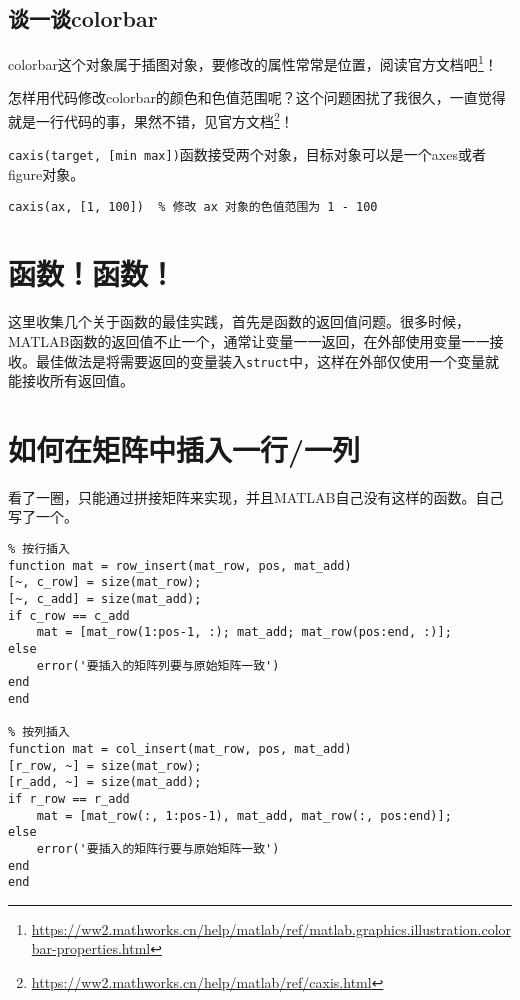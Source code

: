 \subsection{谈一谈colorbar}

colorbar这个对象属于插图对象，要修改的属性常常是位置，阅读官方文档吧\footnote{\url{https://ww2.mathworks.cn/help/matlab/ref/matlab.graphics.illustration.colorbar-properties.html}}！

怎样用代码修改colorbar的颜色和色值范围呢？这个问题困扰了我很久，一直觉得就是一行代码的事，果然不错，见官方文档\footnote{\url{https://ww2.mathworks.cn/help/matlab/ref/caxis.html}}！

\texttt{caxis(target, [min max])}函数接受两个对象，目标对象可以是一个axes或者figure对象。

\begin{verbatim}
caxis(ax, [1, 100])  % 修改 ax 对象的色值范围为 1 - 100
\end{verbatim}

\section{函数！函数！}

这里收集几个关于函数的最佳实践，首先是函数的返回值问题。很多时候，MATLAB函数的返回值不止一个，通常让变量一一返回，在外部使用变量一一接收。最佳做法是将需要返回的变量装入\texttt{struct}中，这样在外部仅使用一个变量就能接收所有返回值。

\section{如何在矩阵中插入一行/一列}

看了一圈，只能通过拼接矩阵来实现，并且MATLAB自己没有这样的函数。自己写了一个。

\begin{verbatim}
% 按行插入
function mat = row_insert(mat_row, pos, mat_add)
[~, c_row] = size(mat_row);
[~, c_add] = size(mat_add);
if c_row == c_add
    mat = [mat_row(1:pos-1, :); mat_add; mat_row(pos:end, :)];
else
    error('要插入的矩阵列要与原始矩阵一致')
end
end

% 按列插入
function mat = col_insert(mat_row, pos, mat_add)
[r_row, ~] = size(mat_row);
[r_add, ~] = size(mat_add);
if r_row == r_add
    mat = [mat_row(:, 1:pos-1), mat_add, mat_row(:, pos:end)];
else
    error('要插入的矩阵行要与原始矩阵一致')
end
end
\end{verbatim}

